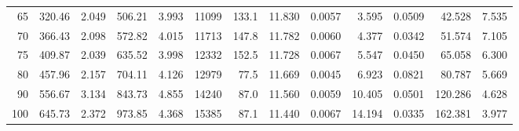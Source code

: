 \documentclass[10pt]{article}
\begin{document}
{\begin{tabular}{|r|rr|rr|rr|rr|rr|r|r|}
       65 &       320.46 &        2.049 &       506.21 &        3.993 &        11099 &        133.1 &       11.830 &       0.0057 &        3.595 &       0.0509 &       42.528 &        7.535 \\
       70 &       366.43 &        2.098 &       572.82 &        4.015 &        11713 &        147.8 &       11.782 &       0.0060 &        4.377 &       0.0342 &       51.574 &        7.105 \\
       75 &       409.87 &        2.039 &       635.52 &        3.998 &        12332 &        152.5 &       11.728 &       0.0067 &        5.547 &       0.0450 &       65.058 &        6.300 \\
       80 &       457.96 &        2.157 &       704.11 &        4.126 &        12979 &         77.5 &       11.669 &       0.0045 &        6.923 &       0.0821 &       80.787 &        5.669 \\
       90 &       556.67 &        3.134 &       843.73 &        4.855 &        14240 &         87.0 &       11.560 &       0.0059 &       10.405 &       0.0501 &      120.286 &        4.628 \\
      100 &       645.73 &        2.372 &       973.85 &        4.368 &        15385 &         87.1 &       11.440 &       0.0067 &       14.194 &       0.0335 &      162.381 &        3.977 \\
\hline
\end{tabular}
}







\pagebreak
\end{document}
